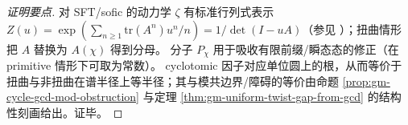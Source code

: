 \begin{proof}[证明要点]
对 SFT/sofic 的动力学 \(\zeta\) 有标准行列式表示 \(Z(u)=\exp(\sum_{n\ge 1}\mathrm{tr}(A^n)u^n/n)=1/\det(I-uA)\)（参见 \cite[Chapter~6]{LindMarcus1995}）；扭曲情形把 \(A\) 替换为 \(A(\chi)\) 得到分母。
分子 \(P_\chi\) 用于吸收有限前缀/瞬态态的修正（在 primitive 情形下可取为常数）。
cyclotomic 因子对应单位圆上的根，从而等价于扭曲与非扭曲在谱半径上等半径；其与模共边界/障碍的等价由命题 \ref{prop:gm-cycle-gcd-mod-obstruction} 与定理 \ref{thm:gm-uniform-twist-gap-from-gcd} 的结构性刻画给出。证毕。
\end{proof}

\endinput

